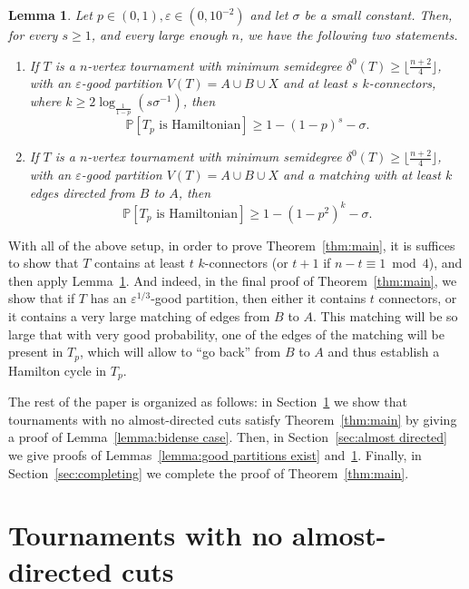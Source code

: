 \documentclass[a4paper,11pt]{article}
\newtheorem{lemma}[theorem]{\bf Lemma}
\theoremstyle{definition}
\def\eps{\varepsilon}
\def\Pb{\mathbb{P}}
\begin{document}
\begin{lemma}\label{lemma:using connectors}
Let $p\in (0, 1), \eps\in (0, 10^{-2})$ and let $\sigma$ be a small constant. Then, for every $s\geq 1$, and every large enough $n$, we have the following two statements. 
\begin{enumerate}
    \item[(a)] If $T$ is a $n$-vertex tournament with minimum semidegree $\delta^0(T)\geq \lfloor \frac{n+2}{4}\rfloor$, with an $\eps$-good partition $V(T)=A\cup B\cup X$ and at least $s$ $k$-connectors, where $k\geq 2\log_{\frac{1}{1-p}}(s\sigma^{-1})$, then \[\Pb[T_p\text{ is Hamiltonian}]\geq 1-(1-p)^s-\sigma.\]
    \item[(b)] If $T$ is a $n$-vertex tournament with minimum semidegree $\delta^0(T)\geq \lfloor \frac{n+2}{4}\rfloor$, with an $\eps$-good partition $V(T)=A\cup B\cup X$ and a matching with at least $k$ edges directed from $B$ to $A$, then \[\Pb[T_p\text{ is Hamiltonian}]\geq 1-(1-p^2)^k-\sigma.\]
\end{enumerate}

\end{lemma}

With all of the above setup, in order to prove Theorem~\ref{thm:main}, it is suffices to show that $T$ contains at least $t$ $k$-connectors (or $t+1$ if $n-t\equiv 1\bmod 4$), and then apply Lemma~\ref{lemma:using connectors}. And indeed, in the final proof of Theorem~\ref{thm:main}, we show that if $T$ has an $\eps^{1/3}$-good partition, then either it contains $t$ connectors, or it contains a very large matching of edges from $B$ to $A$. This matching will be so large that with very good probability, one of the edges of the matching will be present in $T_p$, which will allow to ``go back'' from $B$ to $A$ and thus establish a Hamilton cycle in $T_p$. 

The rest of the paper is organized as follows: in Section~\ref{sec:bidense} we show that tournaments with no almost-directed cuts satisfy Theorem~\ref{thm:main} by giving a proof of Lemma~\ref{lemma:bidense case}. Then, in Section~\ref{sec:almost directed} we give proofs of Lemmas~\ref{lemma:good partitions exist} and~\ref{lemma:using connectors}. Finally, in Section~\ref{sec:completing} we complete the proof of Theorem~\ref{thm:main}.

\section{Tournaments with no almost-directed cuts}\label{sec:bidense}
\end{document}
